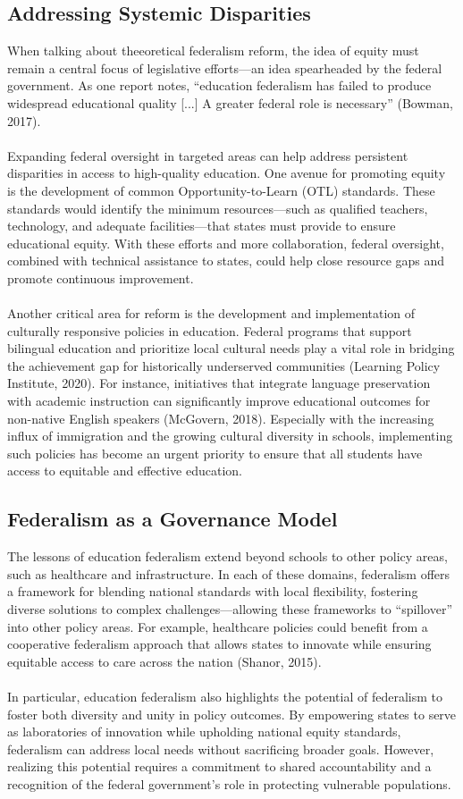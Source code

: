 \documentclass[11pt]{extarticle}
\begin{document}
\subsection{Addressing Systemic Disparities}
When talking about theeoretical federalism reform, the idea of equity must remain a central focus of legislative efforts---an idea spearheaded by the federal government. As one report notes, ``education federalism has failed to produce widespread educational quality [...] A greater federal role is necessary” (Bowman, 2017).
\\
\\
Expanding federal oversight in targeted areas can help address persistent disparities in access to high-quality education. One avenue for promoting equity is the development of common Opportunity-to-Learn (OTL) standards. These standards would identify the minimum resources—such as qualified teachers, technology, and adequate facilities—that states must provide to ensure educational equity. With these efforts and more collaboration, federal oversight, combined with technical assistance to states, could help close resource gaps and promote continuous improvement.\\
\\
Another critical area for reform is the development and implementation of culturally responsive policies in education. Federal programs that support bilingual education and prioritize local cultural needs play a vital role in bridging the achievement gap for historically underserved communities (Learning Policy Institute, 2020). For instance, initiatives that integrate language preservation with academic instruction can significantly improve educational outcomes for non-native English speakers (McGovern, 2018). Especially with the increasing influx of immigration and the growing cultural diversity in schools, implementing such policies has become an urgent priority to ensure that all students have access to equitable and effective education.
\subsection{Federalism as a Governance Model}
The lessons of education federalism extend beyond schools to other policy areas, such as healthcare and infrastructure. In each of these domains, federalism offers a framework for blending national standards with local flexibility, fostering diverse solutions to complex challenges---allowing these frameworks to ``spillover'' into other policy areas. For example, healthcare policies could benefit from a cooperative federalism approach that allows states to innovate while ensuring equitable access to care across the nation (Shanor, 2015).\\
\\
In particular, education federalism also highlights the potential of federalism to foster both diversity and unity in policy outcomes. By empowering states to serve as laboratories of innovation while upholding national equity standards, federalism can address local needs without sacrificing broader goals. However, realizing this potential requires a commitment to shared accountability and a recognition of the federal government’s role in protecting vulnerable populations. 
\end{document}
